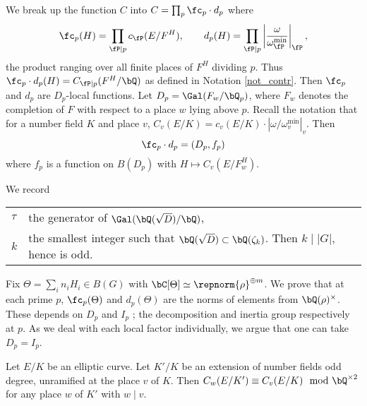 We break up the function $C$ into $C = \prod_p  \fc_p \cdot d_p$ where
\begin{equation}\label{c-and-d}
         \fc_p(H) = \prod_{\fP | p}  c_{\fP}(E / F^H) , \qquad d_p(H) = \prod_{\fP | p} \left|\frac{\omega}{\omega_{\fP}^{\min}}\right|_{\fP}, 
\end{equation}
the product ranging over all finite places of $F^H$ dividing $p$. Thus $\fc_p\cdot d_p (H) = C_{\fP | p }(F^H / \bQ)$ as defined in Notation \ref{not_contr}.
Then $\fc_p$ and $d_p$ are $D_p$-local functions. Let $D_p = \Gal(F_w / \bQ_p)$, where $F_w$ denotes the completion of $F$ with respect to a place $w$ lying above $p$. Recall the notation that for a number field $K$ and place $v$, $C_v(E / K) = c_v(E / K) \cdot \left| \omega / \omega_v^{\min} \right|_v.$ 
Then
\begin{equation}\label{Dp-loc}
\fc_p \cdot d_p = (D_p, f_p)
\end{equation}
where $f_p$ is a function on $B(D_p)$ with $H \mapsto C_v(E / F_w^H)$.

We record
\begin{table}[H]
         \vspace{-1em}
         \setlength\itemsep{0em}
        \centering
\begin{tabular}{l l}
    $\tau$ & the generator of $\Gal(\bQ(\sqrt{D}) / \bQ)$, \\
    $k$ & the smallest integer such that $\bQ(\sqrt{D}) \subset \bQ(\zeta_k)$. Then $k \mid |G|$, hence is odd.
\end{tabular}
\vspace{-1em}
\end{table}
Fix $\Theta = \sum_i n_i H_i \in B(G)$ with $\bC[\Theta] \simeq \repnorm{\rho}^{\oplus m}$. We prove that at each prime $p$, $\fc_p(\Theta)$ and $d_p(\Theta)$ are the norms of elements from $\bQ(\rho)^{\times}$.  These depends on $D_p$ and $I_p$ ; the decomposition and inertia group respectively at $p$. As we deal with each local factor individually, we argue that one can take $D_p = I_p$.

\begin{lemma}\label{tam-up-to-square}
    Let $E / K$ be an elliptic curve. Let $K' / K$ be an extension of number fields odd degree, unramified at the place $v$ of $K$. Then $C_w(E / K') \equiv C_v(E / K) \mod \bQ^{\times 2}$ for any place $w$ of $K'$ with $ w \mid v$. 
\end{lemma}


